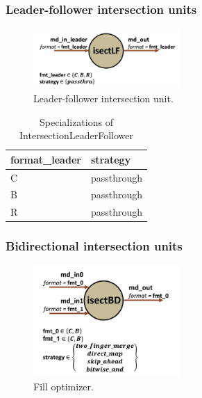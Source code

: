 \subsubsection{Leader-follower intersection units}

\begin{figure}[H]
    \centering
    \includegraphics[width=0.5\textwidth]{figures/isectlf.png}
    \caption{Leader-follower intersection unit.}
    \label{fig:fopt}
\end{figure}

\begin{table}[H]
\centering
\begin{tabular}{ll}
\toprule
 format\_leader   & strategy    \\
\midrule
 C               & passthrough \\
 B               & passthrough \\
 R               & passthrough \\
\bottomrule
\end{tabular}
\caption{Specializations of IntersectionLeaderFollower}
\label{tab:IntersectionLeaderFollower_specializations}
\end{table}

\subsubsection{Bidirectional intersection units}

\begin{figure}[H]
    \centering
    \includegraphics[width=0.5\textwidth]{figures/isectbd.png}
    \caption{Fill optimizer.}
    \label{fig:fopt}
\end{figure}

